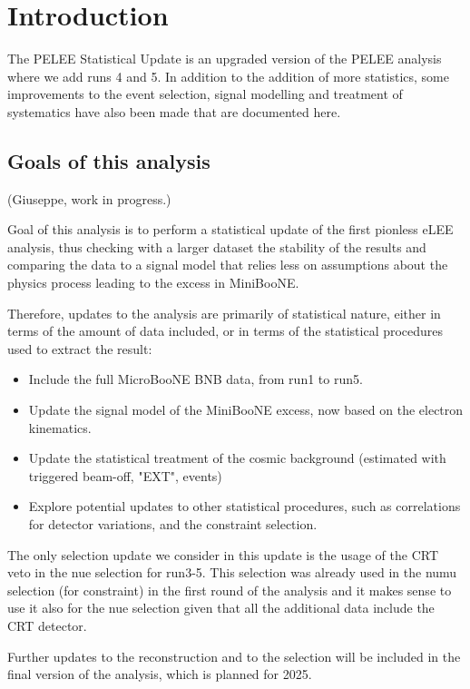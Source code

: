 \section{Introduction}
\label{sec:Introduction}

The PELEE Statistical Update is an upgraded version of the PELEE analysis where we add runs 4 and 5. In addition to the addition of more statistics, some improvements to the event selection, signal modelling and treatment of systematics have also been made that are documented here. 

\subsection{Goals of this analysis}
\label{sec:Goals}
(Giuseppe, work in progress.)

Goal of this analysis is to perform a statistical update of the first pionless eLEE analysis, thus checking with a larger dataset the stability of the results and comparing the data to a signal model that relies less on assumptions about the physics process leading to the excess in MiniBooNE.

Therefore, updates to the analysis are primarily of statistical nature, either in terms of the amount of data included, or in terms of the statistical procedures used to extract the result:
\begin{itemize}
    \item Include the full MicroBooNE BNB data, from run1 to run5.
    \item Update the signal model of the MiniBooNE excess, now based on the electron kinematics.
    \item Update the statistical treatment of the cosmic background (estimated with triggered beam-off, "EXT", events)
    \item Explore potential updates to other statistical procedures, such as correlations for detector variations, and the constraint selection.
\end{itemize}
The only selection update we consider in this update is the usage of the CRT veto in the nue selection for run3-5. This selection was already used in the numu selection (for constraint) in the first round of the analysis and it makes sense to use it also for the nue selection given that all the additional data include the CRT detector.

Further updates to the reconstruction and to the selection will be included in the final version of the analysis, which is planned for 2025.